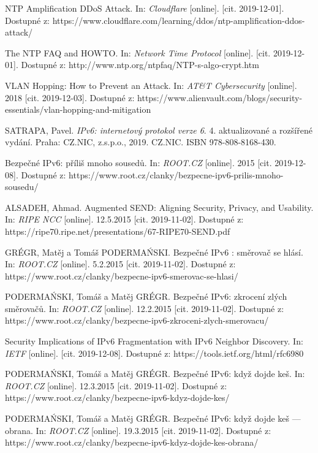 \begin{literatura}{99}
NTP Amplification DDoS Attack. In: \textit{Cloudflare} [online]. [cit. 2019-12-01]. Dostupné z: https://www.cloudflare.com/learning/ddos/ntp-amplification-ddos-attack/

The NTP FAQ and HOWTO. In: \textit{Network Time Protocol} [online]. [cit. 2019-12-01]. Dostupné z: http://www.ntp.org/ntpfaq/NTP-s-algo-crypt.htm

VLAN Hopping: How to Prevent an Attack. In: \textit{AT\&T Cybersecurity} [online]. 2018 [cit. 2019-12-03]. Dostupné z: https://www.alienvault.com/blogs/security-essentials/vlan-hopping-and-mitigation

SATRAPA, Pavel. \textit{IPv6: internetový protokol verze 6}. 4. aktualizované a rozšířené vydání. Praha: CZ.NIC, z.s.p.o., 2019. CZ.NIC. ISBN 978-808-8168-430.

Bezpečné IPv6: příliš mnoho sousedů. In: \textit{ROOT.CZ} [online]. 2015 [cit. 2019-12-08]. Dostupné z: https://www.root.cz/clanky/bezpecne-ipv6-prilis-mnoho-
sousedu/

ALSADEH, Ahmad. Augmented SEND: Aligning Security, Privacy, and Usability. In: \textit{RIPE NCC} [online]. 12.5.2015 [cit. 2019-11-02]. Dostupné z: https://ripe70.ripe.net/presentations/67-RIPE70-SEND.pdf

GRÉGR, Matěj a Tomáš PODERMAŃSKI. Bezpečné IPv6 : směrovač se hlásí. In: \textit{ROOT.CZ} [online]. 5.2.2015 [cit. 2019-11-02]. Dostupné z: https://www.root.cz/clanky/bezpecne-ipv6-smerovac-se-hlasi/

PODERMAŃSKI, Tomáš a Matěj GRÉGR. Bezpečné IPv6: zkrocení zlých směrovačů. In: \textit{ROOT.CZ} [online]. 12.2.2015 [cit. 2019-11-02]. Dostupné z: https://www.root.cz/clanky/bezpecne-ipv6-zkroceni-zlych-smerovacu/

Security Implications of IPv6 Fragmentation with IPv6 Neighbor Discovery. In: \textit{IETF} [online]. [cit. 2019-12-08]. Dostupné z: https://tools.ietf.org/html/rfc6980
	

PODERMAŃSKI, Tomáš a Matěj GRÉGR. Bezpečné IPv6: když dojde keš. In: \textit{ROOT.CZ} [online]. 12.3.2015 [cit. 2019-11-02]. Dostupné z: https://www.root.cz/clanky/bezpecne-ipv6-kdyz-dojde-kes/

PODERMAŃSKI, Tomáš a Matěj GRÉGR. Bezpečné IPv6: když dojde keš --- obrana. In: \textit{ROOT.CZ} [online]. 19.3.2015 [cit. 2019-11-02]. Dostupné z: https://www.root.cz/clanky/bezpecne-ipv6-kdyz-dojde-kes-obrana/




\end{literatura}
